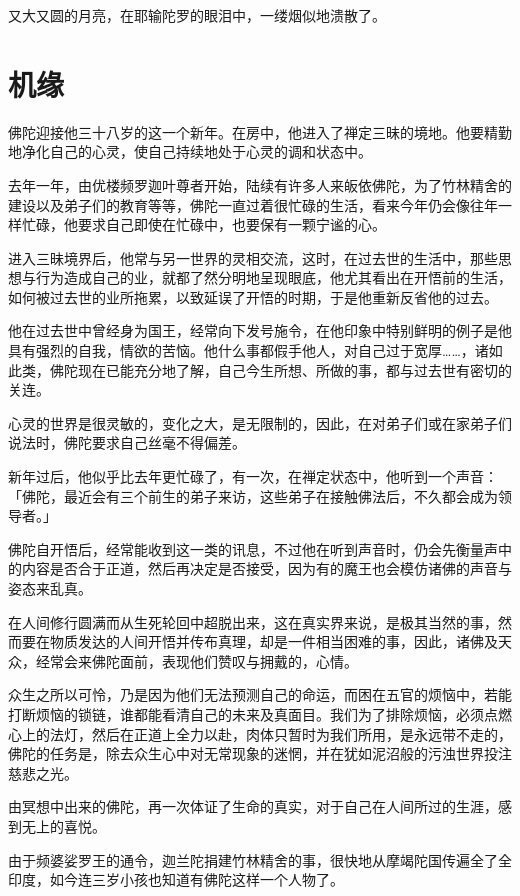 \documentclass[12pt,twoside,openany]{book}
\begin{document}
又大又圆的月亮，在耶输陀罗的眼泪中，一缕烟似地溃散了。

\section{机缘}\label{sec3.14}

佛陀迎接他三十八岁的这一个新年。在房中，他进入了禅定三昧的境地。他要精勤地净化自己的心灵，使自己持续地处于心灵的调和状态中。

去年一年，由优楼频罗迦叶尊者开始，陆续有许多人来皈依佛陀，为了竹林精舍的建设以及弟子们的教育等等，佛陀一直过着很忙碌的生活，看来今年仍会像往年一样忙碌，他要求自己即使在忙碌中，也要保有一颗宁谧的心。

进入三昧境界后，他常与另一世界的灵相交流，这时，在过去世的生活中，那些思想与行为造成自己的业，就都了然分明地呈现眼底，他尤其看出在开悟前的生活，如何被过去世的业所拖累，以致延误了开悟的时期，于是他重新反省他的过去。

他在过去世中曾经身为国王，经常向下发号施令，在他印象中特别鲜明的例子是他具有强烈的自我，情欲的苦恼。他什么事都假手他人，对自己过于宽厚……，诸如此类，佛陀现在已能充分地了解，自己今生所想、所做的事，都与过去世有密切的关连。

心灵的世界是很灵敏的，变化之大，是无限制的，因此，在对弟子们或在家弟子们说法时，佛陀要求自己丝毫不得偏差。

新年过后，他似乎比去年更忙碌了，有一次，在禅定状态中，他听到一个声音：「佛陀，最近会有三个前生的弟子来访，这些弟子在接触佛法后，不久都会成为领导者。」

佛陀自开悟后，经常能收到这一类的讯息，不过他在听到声音时，仍会先衡量声中的内容是否合于正道，然后再决定是否接受，因为有的魔王也会模仿诸佛的声音与姿态来乱真。

在人间修行圆满而从生死轮回中超脱出来，这在真实界来说，是极其当然的事，然而要在物质发达的人间开悟并传布真理，却是一件相当困难的事，因此，诸佛及天众，经常会来佛陀面前，表现他们赞叹与拥戴的，心情。

众生之所以可怜，乃是因为他们无法预测自己的命运，而困在五官的烦恼中，若能打断烦恼的锁链，谁都能看清自己的未来及真面目。我们为了排除烦恼，必须点燃心上的法灯，然后在正道上全力以赴，肉体只暂时为我们所用，是永远带不走的，佛陀的任务是，除去众生心中对无常现象的迷惘，并在犹如泥沼般的污浊世界投注慈悲之光。

由冥想中出来的佛陀，再一次体证了生命的真实，对于自己在人间所过的生涯，感到无上的喜悦。

由于频婆娑罗王的通令，迦兰陀捐建竹林精舍的事，很快地从摩竭陀国传遍全了全印度，如今连三岁小孩也知道有佛陀这样一个人物了。
\end{document}
